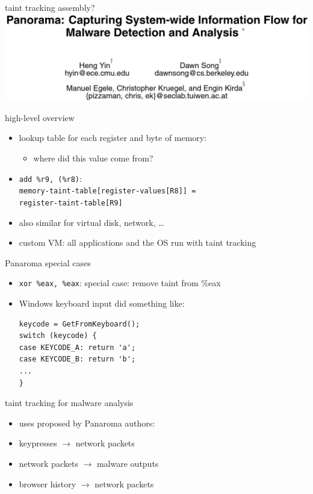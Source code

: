 \begin{frame}{taint tracking assembly?}
\includegraphics[width=\textwidth]{../taint/panaroma}
\end{frame}

\begin{frame}{high-level overview}
\begin{itemize}
\item lookup table for each register and byte of memory:
    \begin{itemize}
    \item where did this value come from?
    \end{itemize}
\item \texttt{add \%r9, (\%r8)}: \\
    \texttt{memory-taint-table[register-values[R8]] =} \\
    \hspace{4cm} \texttt{register-taint-table[R9]}
\item also similar for virtual disk, network, \ldots
\item custom VM: all applications and the OS run with taint tracking
\end{itemize}
\end{frame}

\begin{frame}[fragile,label=panaromaSpecial]{Panaroma special cases}
\begin{itemize}
\item \texttt{xor \%eax, \%eax}: special case: remove taint from \%eax
\item Windows keyboard input did something like:
\begin{lstlisting}
keycode = GetFromKeyboard();
switch (keycode) {
case KEYCODE_A: return 'a';
case KEYCODE_B: return 'b';
...
}
\end{lstlisting}
\end{itemize}
\end{frame}

\begin{frame}{taint tracking for malware analysis}
\begin{itemize}
\item uses proposed by Panaroma authors:
\vspace{.5cm}
\item keypresses $\rightarrow$ network packets
\item network packets $\rightarrow$ malware outputs
\item browser history $\rightarrow$ network packets
\end{itemize}
\end{frame}
